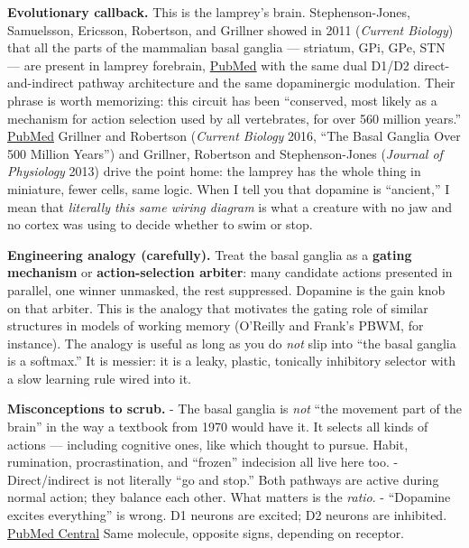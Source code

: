 \textbf{Evolutionary callback.} This is the lamprey's brain. Stephenson-Jones, Samuelsson, Ericsson, Robertson, and Grillner showed in 2011 (\emph{Current Biology}) that all the parts of the mammalian basal ganglia --- striatum, GPi, GPe, STN --- are present in lamprey forebrain, \href{https://pubmed.ncbi.nlm.nih.gov/21700460/?dopt=Abstract}{PubMed} with the same dual D1/D2 direct-and-indirect pathway architecture and the same dopaminergic modulation. Their phrase is worth memorizing: this circuit has been ``conserved, most likely as a mechanism for action selection used by all vertebrates, for over 560 million years.'' \href{https://pubmed.ncbi.nlm.nih.gov/21700460/?dopt=Abstract}{PubMed} Grillner and Robertson (\emph{Current Biology} 2016, ``The Basal Ganglia Over 500 Million Years'') and Grillner, Robertson and Stephenson-Jones (\emph{Journal of Physiology} 2013) drive the point home: the lamprey has the whole thing in miniature, fewer cells, same logic. When I tell you that dopamine is ``ancient,'' I mean that \emph{literally this same wiring diagram} is what a creature with no jaw and no cortex was using to decide whether to swim or stop.

\textbf{Engineering analogy (carefully).} Treat the basal ganglia as a \textbf{gating mechanism} or \textbf{action-selection arbiter}: many candidate actions presented in parallel, one winner unmasked, the rest suppressed. Dopamine is the gain knob on that arbiter. This is the analogy that motivates the gating role of similar structures in models of working memory (O'Reilly and Frank's PBWM, for instance). The analogy is useful as long as you do \emph{not} slip into ``the basal ganglia is a softmax.'' It is messier: it is a leaky, plastic, tonically inhibitory selector with a slow learning rule wired into it.

\textbf{Misconceptions to scrub.} - The basal ganglia is \emph{not} ``the movement part of the brain'' in the way a textbook from 1970 would have it. It selects all kinds of actions --- including cognitive ones, like which thought to pursue. Habit, rumination, procrastination, and ``frozen'' indecision all live here too. - Direct/indirect is not literally ``go and stop.'' Both pathways are active during normal action; they balance each other. What matters is the \emph{ratio}. - ``Dopamine excites everything'' is wrong. D1 neurons are excited; D2 neurons are inhibited. \href{https://pmc.ncbi.nlm.nih.gov/articles/PMC3853485/}{PubMed Central} Same molecule, opposite signs, depending on receptor.

